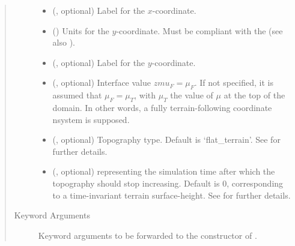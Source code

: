 \documentclass[letterpaper,10pt,english]{sphinxmanual}
\begin{document}
\begin{fulllineitems}
\begin{fulllineitems}
\begin{quote}
\begin{description}
\begin{itemize}
\item {} 
 (, optional) \textendash{} Label for the \(x\)-coordinate.

\item {} 
\sphinxstyleliteralstrong{, } () \textendash{} 
Units for the \(y\)-coordinate. Must be compliant with the 
(see also {\hyperref[\detokenize{api:grids.axis.Axis.__init__}]{}}).


\item {} 
 (, optional) \textendash{} Label for the \(y\)-coordinate.

\item {} 
 (, optional) \textendash{} Interface value \(zmu_F = \mu_F\). If not specified, it is assumed that \(\mu_F = \mu_T\), with
\(\mu_T\) the value of \(\mu\) at the top of the domain. In other words, a fully terrain-following
coordinate nsystem is supposed.

\item {} 
 (, optional) \textendash{} Topography type. Default is ‘flat\_terrain’. See {\hyperref[\detokenize{api:module-grids.topography}]{}} for further details.

\item {} 
 (, optional) \textendash{}  representing the simulation time after which the topography should stop increasing.
Default is 0, corresponding to a time-invariant terrain surface-height. See {\hyperref[\detokenize{api:module-grids.topography}]{}} for further
details.

\end{itemize}

\item[{Keyword Arguments}] \leavevmode
{} \textendash{} Keyword arguments to be forwarded to the constructor of {\hyperref[\detokenize{api:grids.topography.Topography2d}]{}}.

\end{description}\end{quote}


\end{fulllineitems}
\end{fulllineitems}
\end{document}
